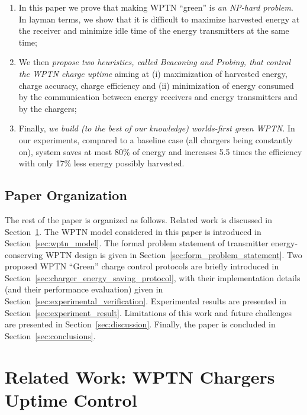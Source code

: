 \documentclass[11pt,draftclsnofoot,journal,onecolumn]{IEEEtran}
\begin{document}
\begin{enumerate}
\item In this paper we prove that making WPTN ``green'' is \emph{an NP-hard problem}. In layman terms, we show that it is difficult to maximize harvested energy at the receiver and minimize idle time of the energy transmitters at the same time;

\item We then \emph{propose two heuristics, called Beaconing and Probing, that control the WPTN charge uptime} aiming at (i) maximization of harvested energy, charge accuracy, charge efficiency and (ii) minimization of energy consumed by the communication between energy receivers and energy transmitters and by the chargers;
 
\item Finally, \emph{we build (to the best of our knowledge) worlds-first green WPTN}. In our experiments, compared to a baseline case (all chargers being constantly on), system saves at most 80\% of energy and increases 5.5 times the efficiency with only 17\% less energy possibly harvested.

\end{enumerate}

\subsection{Paper Organization}
\label{sec:paper_organization}

The rest of the paper is organized as follows. Related work is discussed in Section~\ref{sec:related_work}. The WPTN model considered in this paper is introduced in Section~\ref{sec:wptn_model}. The formal problem statement of transmitter energy-conserving WPTN design is given in Section~\ref{sec:form_problem_statement}. Two proposed WPTN ``Green'' charge control protocols are briefly introduced in Section~\ref{sec:charger_energy_saving_protocol}, with their implementation details (and their performance evaluation) given in Section~\ref{sec:experimental_verification}. Experimental results are presented in Section~\ref{sec:experiment_result}. Limitations of this work and future challenges are presented in Section~\ref{sec:discussion}. Finally, the paper is concluded in Section~\ref{sec:conclusions}.

\section{Related Work: WPTN Chargers Uptime Control}
\label{sec:related_work}
\end{document}
